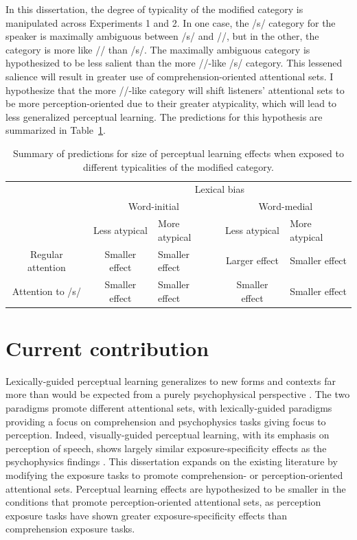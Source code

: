 In this dissertation, the degree of typicality of the modified category is manipulated across Experiments 1 and 2.  
In one case, the /s/ category for the speaker is maximally ambiguous between /s/ and /\textesh/, but in the other, the category is more like /\textesh/ than /s/.
The maximally ambiguous category is hypothesized to be less salient than the more /\textesh/-like /s/ category.
This lessened salience will result in greater use of comprehension-oriented attentional sets.
I hypothesize that the more /\textesh/-like category will shift listeners' attentional sets to be more perception-oriented due to their greater atypicality, which will lead to less generalized perceptual learning.  
The predictions for this hypothesis are summarized in Table~\ref{tbl:predictionsAtyp}.

\begin{table}[ht]
\caption{Summary of predictions for size of perceptual learning effects when exposed to different typicalities of the modified category.}
\label{tbl:predictionsAtyp}
\centering
\small
\begin{tabular}{cclcl}
\toprule
                     & \multicolumn{4}{c}{Lexical bias}                                                                        \\ 
\cline{2-5} 
                     & \multicolumn{2}{c}{Word-initial}                   & \multicolumn{2}{c}{Word-medial}                    \\
\cline{2-3} \cline{4-5}
 & Less atypical & More atypical  & Less atypical & More atypical  \\
\midrule
Regular attention    & Smaller effect                    & Smaller effect & Larger effect                     & Smaller effect \\
Attention to /s/     & Smaller effect                    & Smaller effect & Smaller effect                    & Smaller effect \\ \bottomrule
\end{tabular}
\end{table}

\section{Current contribution}

Lexically-guided perceptual learning generalizes to new forms and contexts far more than would be expected from a purely psychophysical perspective \citep{Norris2003,Gilbert2001}.
The two paradigms promote different attentional sets, with lexically-guided paradigms providing a focus on comprehension and psychophysics tasks giving focus to perception.  
Indeed, visually-guided perceptual learning, with its emphasis on perception of speech, shows largely similar exposure-specificity effects as the psychophysics findings \citep{Reinisch2014}.
This dissertation expands on the existing literature by modifying the exposure tasks to promote comprehension- or perception-oriented attentional sets.
Perceptual learning effects are hypothesized to be smaller in the conditions that promote perception-oriented attentional sets, as perception exposure tasks have shown greater exposure-specificity effects than comprehension exposure tasks.

